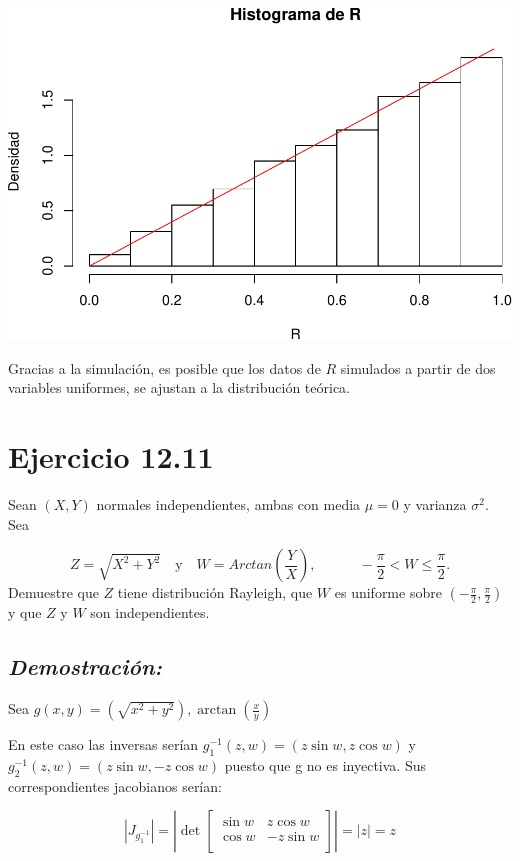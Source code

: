 \documentclass[]{article}
\begin{document}
\includegraphics[width=0.75\linewidth]{notebook_simulaciones_files/figure-latex/unnamed-chunk-1-1}

Gracias a la simulación, es posible que los datos de \(R\) simulados a
partir de dos variables uniformes, se ajustan a la distribución teórica.

\section{Ejercicio 12.11}\label{ejercicio-12.11}

Sean \((X, Y)\) normales independientes, ambas con media \(\mu=0\) y
varianza \(\sigma^2\). Sea

\[
Z = \sqrt{X^2 + Y^2} \quad \text{y}\quad W=Arctan\left(\frac{Y}{X}\right), \quad\quad\quad-\frac{\pi}{2}<W\leq\frac{\pi}{2}.
\] Demuestre que \(Z\) tiene distribución Rayleigh, que \(W\) es
uniforme sobre \(\left(-\frac{\pi}{2},\frac{\pi}{2} \right)\) y que
\(Z\) y \(W\) son independientes.

\subsection{\texorpdfstring{\emph{Demostración:}}{Demostración:}}\label{demostracion-1}

Sea
\(g(x,y)=\left(\sqrt{x^2+y^2}\right), \arctan\left(\frac{x}{y}\right)\)

En este caso las inversas serían \(g_1^{-1}(z,w)=(z\sin w,z\cos w)\) y
\(g_2^{-1}(z,w)=(z\sin w,-z\cos w)\) puesto que g no es inyectiva. Sus
correspondientes jacobianos serían:

\begin{equation}
\left| J_{g_1^{-1}}  \right|
=\left| \det 
\begin{bmatrix} 
\sin w &  z\cos w \\
\cos w &  -z\sin w \\
\end{bmatrix}  \right|
=|z|=z
\end{equation}
\end{document}
